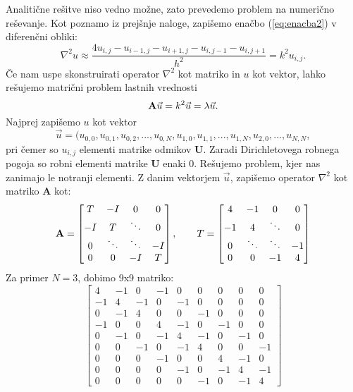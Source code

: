 \documentclass[12pt,a4paper]{article}
\begin{document}
Analitične rešitve niso vedno možne, zato prevedemo problem na numerično reševanje. Kot poznamo iz prejšnje naloge, zapišemo enačbo (\ref{eq:enacba2}) v diferenčni obliki:
\begin{equation}
\nabla ^{2} u \approx \frac{4u_{i,j}-u_{i-1,j} - u_{i+1,j} - u_{i,j-1} - u_{i,j+1}}{h^{2}}= k^{2}u_{i,j}.
\end{equation}
Če nam uspe skonstruirati operator $\nabla^{2}$ kot matriko in $u$ kot vektor, lahko rešujemo matrični problem lastnih vrednosti
\begin{equation}
\textbf{\textrm {A}}\vec{u}= k^{2} \vec{u} = \lambda \vec{u}.
\end{equation}
Najprej zapišemo $u$ kot vektor
\begin{equation}
\vec{u}=(u_{0,0}, u_{0,1}, u_{0,2},... ,u_{0,N}, u_{1,0}, u_{1,1},...,u_{1,N}, u_{2,0},..., u_{N,N},
\end{equation}
pri čemer so $u_{i,j}$ elementi matrike odmikov \textbf{U}. Zaradi Dirichletovega robnega pogoja so robni elementi matrike \textbf{U} enaki 0. Rešujemo problem, kjer nas zanimajo le notranji elementi. Z danim vektorjem $\vec{u}$, zapišemo operator $\nabla ^{2}$ kot matriko \textbf{A} kot:
\begin{equation}
\textbf{\textrm {A}} = \begin{bmatrix}
T & -I & 0 & 0\\
-I & T & \ddots & 0\\
0 & \ddots & \ddots & -I\\
0 & 0 & -I & T
\end{bmatrix}, \qquad T= \begin{bmatrix}
4 & -1 & 0 & 0 \\
-1 & 4 & \ddots & 0  \\
 0 & \ddots & \ddots &  -1\\
0 & 0 &   -1 & 4
\end{bmatrix}
\end{equation}
Za primer $N=3$, dobimo 9x9 matriko:
\begin{equation*}
\begin{bmatrix}
4 & -1 & 0 & -1 & 0 & 0 & 0 & 0 & 0 \\
-1 & 4 & -1 & 0 & -1 & 0 & 0 & 0 & 0 \\
0 & -1 & 4 & 0 & 0 & -1 & 0 & 0 & 0 \\
-1 & 0 & 0 & 4 & -1 & 0 & -1 & 0 & 0 \\
0 & -1 & 0 & -1 & 4 & -1 & 0 & -1 & 0 \\
0 & 0 & -1 & 0 & -1 & 4 & 0 & 0 & -1 \\
0 & 0 & 0 & -1 & 0 & 0 & 4 & -1 & 0 \\
0 & 0 & 0 & 0 & -1 & 0 & -1 & 4 & -1 \\
0 & 0 & 0 & 0 & 0 & -1 & 0 & -1 & 4 
\end{bmatrix}  
\end{equation*}
\end{document}
